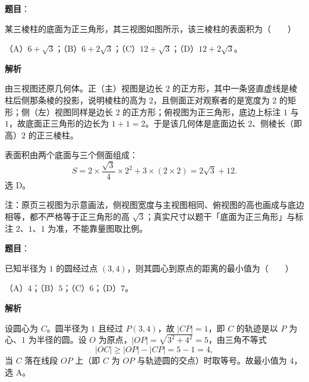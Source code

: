 \begin{answer}

\textbf{题目}：

某三棱柱的底面为正三角形，其三视图如图所示，该三棱柱的表面积为\mbox{（　　）}

（A）$6+\sqrt3$；（B）$6+2\sqrt3$；（C）$12+\sqrt3$；（D）$12+2\sqrt3$。
\nopagebreak[4]
\begin{center}\end{center}
\nopagebreak[4]
\textbf{解析}

由三视图还原几何体。正（主）视图是边长 $2$ 的正方形，其中一条竖直虚线是棱柱后侧那条棱的投影，说明棱柱的高为 $2$，且侧面正对观察者的是宽度为 $2$ 的矩形；侧（左）视图同样是边长 $2$ 的正方形；俯视图为正三角形，底边上标注 $1$ 与 $1$，故底面正三角形的边长为 $1+1=2$。于是该几何体是底面边长 $2$、侧棱长（即高）$2$ 的正三棱柱。

表面积由两个底面与三个侧面组成：
\nopagebreak[4]
\[S=2\times\frac{\sqrt3}4\times2^2+3\times(2\times2)=2\sqrt3+12 .\]
选 D。

\begin{gktip}
注：原页三视图为示意画法，侧视图宽度与主视图相同、俯视图的高也画成与底边相等，都不严格等于正三角形的高 $\sqrt3$；真实尺寸以题干「底面为正三角形」与标注 $2$、$1$、$1$ 为准，不能靠量图取比例。
\end{gktip}


\end{answer}
\begin{answer}

\textbf{题目}：

已知半径为 $1$ 的圆经过点 $(3,4)$，则其圆心到原点的距离的最小值为\mbox{（　　）}

（A）$4$；（B）$5$；（C）$6$；（D）$7$。

\textbf{解析}

设圆心为 $C$。圆半径为 $1$ 且经过 $P(3,4)$，故 $|CP|=1$，即 $C$ 的轨迹是以 $P$ 为心、$1$ 为半径的圆。设 $O$ 为原点，$|OP|=\sqrt{3^2+4^2}=5$，由三角不等式
\nopagebreak[4]
\[|OC|\geqslant|OP|-|CP|=5-1=4,\]
当 $C$ 落在线段 $OP$ 上（即 $C$ 为 $OP$ 与轨迹圆的交点）时取等号。故最小值为 $4$，选 A。


\end{answer}
